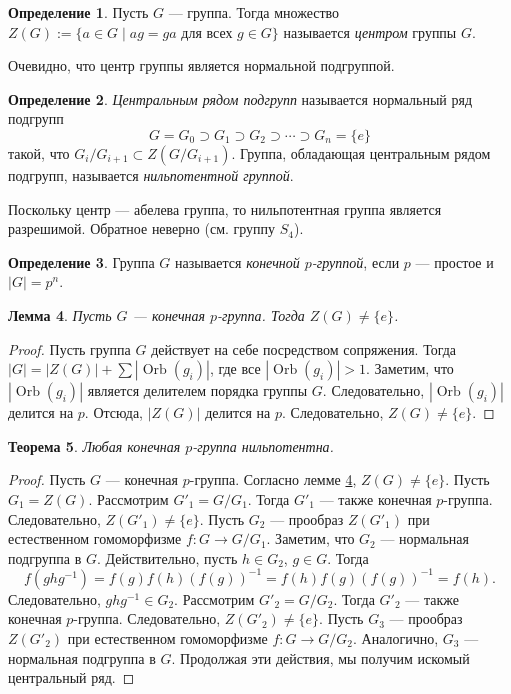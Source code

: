 \documentclass[12pt, titlepage, oneside]{amsbook}
\newcommand{\Orb}{\operatorname{Orb}}
\newtheorem{theorem}{Теорема}[chapter]
\newtheorem{lemma}[theorem]{Лемма}
\theoremstyle{definition}
\newtheorem{definition}[theorem]{Определение}
\theoremstyle{remark}
\begin{document}
\begin{definition}
Пусть $G$ --- группа. Тогда множество $Z(G):=\{a\in G\mid ag=ga
\text{ для всех } g\in G\}$ называется \emph{центром} группы $G$.
\end{definition}

Очевидно, что центр группы является нормальной подгруппой.

\begin{definition}
\emph{Центральным рядом подгрупп} называется нормальный ряд подгрупп $$G=G_0\supset G_1\supset G_2\supset\cdots\supset G_n=\{e\}$$ такой, что $G_i/G_{i+1}\subset Z(G/G_{i+1})$. Группа, обладающая центральным рядом подгрупп, называется \emph{нильпотентной группой}.
\end{definition}

Поскольку центр --- абелева группа, то нильпотентная группа является разрешимой. Обратное неверно (см. группу $S_4$).

\begin{definition}
Группа $G$ называется \emph{конечной $p$-группой}, если $p$ --- простое и $|G|=p^n$.
\end{definition}

\begin{lemma}
\label{Nil1}
Пусть $G$ --- конечная $p$-группа. Тогда $Z(G)\neq\{e\}$.
\end{lemma}

\begin{proof}
Пусть группа $G$ действует на себе посредством сопряжения. Тогда
$|G|=|Z(G)|+\sum |\Orb(g_i)|$, где все $|\Orb(g_i)|>1$. Заметим, что $|\Orb(g_i)|$ является делителем порядка группы
$G$. Следовательно, $|\Orb(g_i)|$ делится на $p$. Отсюда, $|Z(G)|$
делится на $p$. Следовательно, $Z(G)\neq\{e\}$.
\end{proof}

\begin{theorem}
\label{Nil2}
Любая конечная $p$-группа нильпотентна.
\end{theorem}

\begin{proof}
Пусть $G$ --- конечная $p$-группа. Согласно лемме \ref{Nil1}, $Z(G)\neq\{e\}$. Пусть $G_1=Z(G)$. Рассмотрим $G'_1=G/G_1$. Тогда $G'_1$ --- также конечная $p$-группа. Следовательно, $Z(G'_1)\neq\{e\}$. Пусть $G_2$ --- прообраз $Z(G'_1)$ при естественном гомоморфизме $f\colon G\rightarrow G/G_1$. Заметим, что $G_2$ --- нормальная подгруппа в $G$. Действительно, пусть $h\in G_2$, $g\in G$. Тогда $$f(ghg^{-1})=f(g)f(h)(f(g))^{-1}=f(h)f(g)(f(g))^{-1}=f(h).$$ Следовательно, $ghg^{-1}\in G_2$. Рассмотрим $G'_2=G/G_2$. Тогда $G'_2$ --- также конечная $p$-группа. Следовательно, $Z(G'_2)\neq\{e\}$. Пусть $G_3$ --- прообраз $Z(G'_2)$ при естественном гомоморфизме $f\colon G\rightarrow G/G_2$. Аналогично, $G_3$ --- нормальная подгруппа в $G$. Продолжая эти действия, мы получим искомый центральный ряд.
\end{proof}
\end{document}

